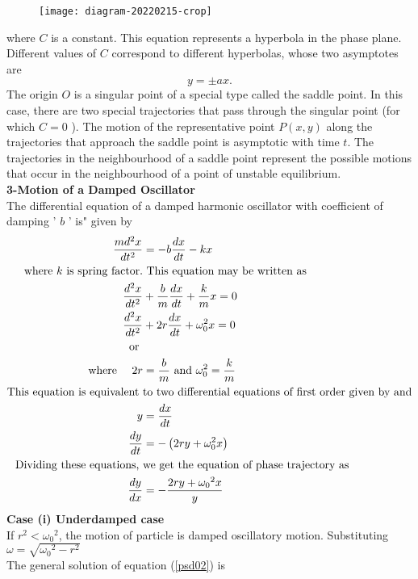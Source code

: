 \begin{figure}[H]
	\centering
	\texttt{[image: diagram-20220215-crop]}
\end{figure}
where $C$ is a constant. This equation represents a hyperbola in the phase plane. Different values of $C$ correspond to different hyperbolas, whose two asymptotes are
$$
y=\pm a x .
$$
The origin $O$ is a singular point of a special type called the saddle point. In this case, there are two special trajectories that pass through the singular point (for which $C=0$ ). The motion of the representative point $P(x, y)$ along the trajectories that approach the saddle point is asymptotic with time $t$. The trajectories in the neighbourhood of a saddle point represent the possible motions that occur in the neighbourhood of a point of unstable equilibrium.\\
\textbf{3-Motion of a Damped Oscillator}\\
The differential equation of a damped harmonic oscillator with coefficient of damping ' $b$ ' is" given by
\begin{align}
\frac{m d^{2} x}{d t^{2}}&=-b \frac{d x}{d t}-k x\notag\\
\text{where $k$ is spring factor.}&\text{ This equation may be written as}\notag\\
\frac{d^{2} x}{d t^{2}}&+\frac{b}{m} \frac{d x}{d t}+\frac{k}{m} x=0 \notag\\
\frac{d^{2} x}{d t^{2}}&+2 r \frac{d x}{d t}+\omega_{0}^{2} x=0\notag\\
\text{ or }\notag\\
\text{where }\quad 2 r&=\frac{b}{m}\text{ and }\omega_{0}^{2}=\frac{k}{m} \label{psd02}\\
\text{This equation is equivalent }&\text{to two differential equations of first order given by and}\notag\\
y&=\frac{d x}{d t} \notag\\
\frac{d y}{d t}&=-\left(2 r y+\omega_{0}^{2} x\right)\notag\\
\text{Dividing these equations, }&\text{we get the equation of phase trajectory as}\notag\\
\frac{d y}{d x}&=-\frac{2 r y+\omega_{0}{ }^{2} x}{y}\notag
\end{align}
\textbf{Case (i) Underdamped case}\\
If $r^{2}<\omega_{0}{ }^{2}$, the motion of particle is damped oscillatory motion. Substituting $\omega=\sqrt{\omega_{0}{ }^{2}-r^{2}}$\\
The general solution of equation (\ref{psd02}) is 

